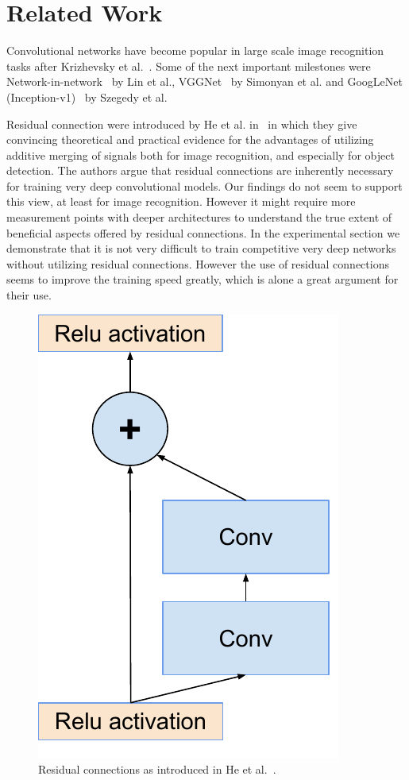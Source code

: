 \section{Related Work}

Convolutional networks have become popular in large scale image recognition
tasks after Krizhevsky et al.~\cite{krizhevsky2012imagenet}. Some of the next important
milestones were Network-in-network~\cite{lin2013network} by Lin et al.,
VGGNet~\cite{simonyan2014very} by Simonyan et al. and GoogLeNet
(Inception-v1)~\cite{szegedy2015going} by Szegedy et al.

Residual connection were introduced by He et al. in~\cite{he2015deep} in
which they give convincing theoretical and practical evidence for the
advantages of utilizing additive merging of signals both for image recognition, and especially for object detection.
The authors argue that residual connections are inherently necessary for training
very deep convolutional models. Our findings do not seem to support this
view, at least for image recognition. However it might require more
measurement points with deeper architectures to understand the true extent
of beneficial aspects offered by residual connections.
In the experimental section we demonstrate that it is not very difficult to
train competitive very deep networks without utilizing residual connections.
However the use of residual connections seems to improve the training speed
greatly, which is alone a great argument for their use.
\begin{figure}
\centering
\includegraphics[width=0.5\linewidth]{resnetsimple}
\caption{Residual connections as introduced in He et al.~\cite{he2015deep}.}
\label{fig:resnetsimple}
\end{figure}
